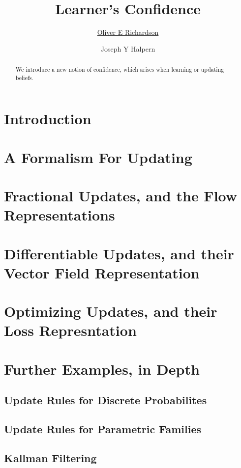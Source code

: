 \documentclass{uai2023} %
\title{%
    Learner's Confidence
}
\author[1]{\href{mailto:<oer5@cornell.edu>?Subject=confidence-paper}{Oliver E Richardson}{}}
\author[1]{Joseph Y Halpern}
\affil[1]{%
    Computer Science Dept.\\
    Cornell University\\
    Ithaca, New York, USA
}
\begin{document}
\maketitle

\begin{abstract}
We introduce a new notion of confidence, which arises when learning or updating beliefs.
\end{abstract}

\section{Introduction}\label{sec:intro}


\section{A Formalism For Updating}


\section{Fractional Updates, and the
    Flow Representations}


\section{Differentiable Updates, and their
    Vector Field Representation}


\section{Optimizing Updates, and their
    Loss Represntation}


\section{Further Examples, in Depth}
\subsection{Update Rules for Discrete Probabilites}

\subsection{Update Rules for Parametric Families}
\subsection{Kallman Filtering}
\end{document}
